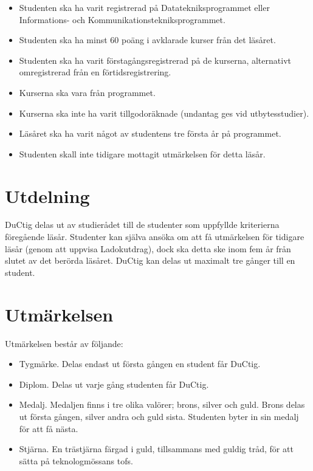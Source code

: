 \documentclass{dsekprotokoll}
\begin{document}
\begin{itemize}
	\item Studenten ska ha varit registrerad på Datatekniksprogrammet eller Informations- och
	      Kommunikationstekniksprogrammet.
	\item Studenten ska ha minst 60 poäng i avklarade kurser från det läsåret.
	\item Studenten ska ha varit förstagångsregistrerad på de kurserna, alternativt omregistrerad från en förtidsregistrering.
	\item Kurserna ska vara från programmet.
	\item Kurserna ska inte ha varit tillgodoräknade (undantag ges vid utbytesstudier).
	\item Läsåret ska ha varit något av studentens tre första år på programmet.
	\item Studenten skall inte tidigare mottagit utmärkelsen för detta läsår.
\end{itemize}


\section{Utdelning}
DuCtig delas ut av studierådet till de studenter som uppfyllde kriterierna föregående läsår. Studenter kan själva ansöka om att få utmärkelsen för tidigare läsår (genom att uppvisa Ladokutdrag), dock ska detta ske inom fem år från slutet av det berörda läsåret. DuCtig kan delas ut
maximalt tre gånger till en student.

\section{Utmärkelsen}
Utmärkelsen består av följande:
\begin{itemize}
	\item Tygmärke. Delas endast ut första gången en student får DuCtig.
	\item Diplom. Delas ut varje gång studenten får DuCtig.
	\item Medalj. Medaljen finns i tre olika valörer; brons, silver och guld. Brons delas ut första
	      gången, silver andra och guld sista. Studenten byter in sin medalj för att få nästa.
	\item Stjärna. En trästjärna färgad i guld, tillsammans med guldig tråd, för att sätta på teknologmössans tofs.
\end{itemize}
\end{document}
